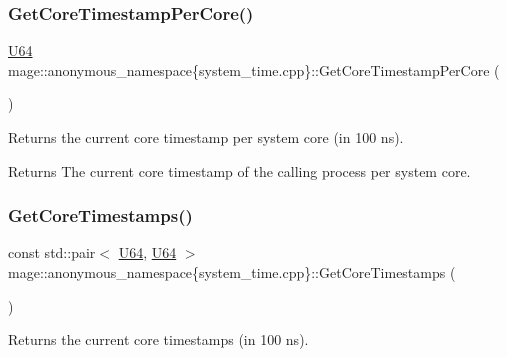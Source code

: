 \subsubsection{\texorpdfstring{Get\+Core\+Timestamp\+Per\+Core()}{GetCoreTimestampPerCore()}}
{\footnotesize\ttfamily \mbox{\hyperlink{namespacemage_ae0ad2dd0035dba92ed0f2e84c182b03b}{U64}} mage\+::anonymous\+\_\+namespace\{system\+\_\+time.\+cpp\}\+::Get\+Core\+Timestamp\+Per\+Core (\begin{DoxyParamCaption}{ }\end{DoxyParamCaption})\hspace{0.3cm}{\ttfamily [noexcept]}}

Returns the current core timestamp per system core (in 100 ns).

\begin{DoxyReturn}{Returns}
The current core timestamp of the calling process per system core. 
\end{DoxyReturn}
\mbox{\label{namespacemage_1_1anonymous__namespace_02system__time_8cpp_03_a5aa13d5f304eff071fda38d2218400c1}} 
\subsubsection{\texorpdfstring{Get\+Core\+Timestamps()}{GetCoreTimestamps()}}
{\footnotesize\ttfamily const std\+::pair$<$ \mbox{\hyperlink{namespacemage_ae0ad2dd0035dba92ed0f2e84c182b03b}{U64}}, \mbox{\hyperlink{namespacemage_ae0ad2dd0035dba92ed0f2e84c182b03b}{U64}} $>$ mage\+::anonymous\+\_\+namespace\{system\+\_\+time.\+cpp\}\+::Get\+Core\+Timestamps (\begin{DoxyParamCaption}{ }\end{DoxyParamCaption})\hspace{0.3cm}{\ttfamily [noexcept]}}

Returns the current core timestamps (in 100 ns).

